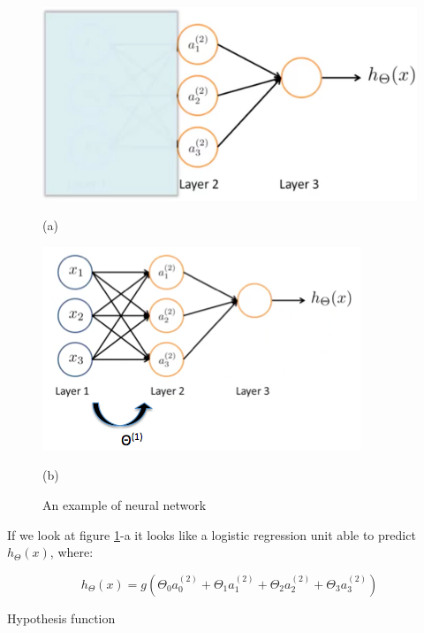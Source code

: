 \begin{figure}[H]
	\centering
	\begin{minipage}[c]{.43\textwidth}
		\centering
		\includegraphics[scale=0.15]{images/logisticnet}
		\caption*{(a)}
	\end{minipage}%
	\hspace{4mm}%
	\begin{minipage}[c]{.43\textwidth}
		\centering
		\includegraphics[scale=0.45]{images/logisticnet2}
		\caption*{(b)}
	\end{minipage}
	\caption{An example of neural network}
	\label{logisticnet}
\end{figure}


If we look at figure \ref{logisticnet}-a it looks like a logistic regression unit able to predict $h_{\Theta}(x)$, where:

\begin{eqfloat}[H]
\begin{equation}
	h_{\Theta}(x) = g( \Theta_{0}a_0^{(2)} + \Theta_{1}a_1^{(2)} +  \Theta_{2}a_2^{(2)} + \Theta_{3}a_3^{(2)} )
\end{equation}
      \addtocounter{equation}{-1}
        \caption{  Hypothesis function}
        \label{eq:logistic}
    \end{eqfloat}



